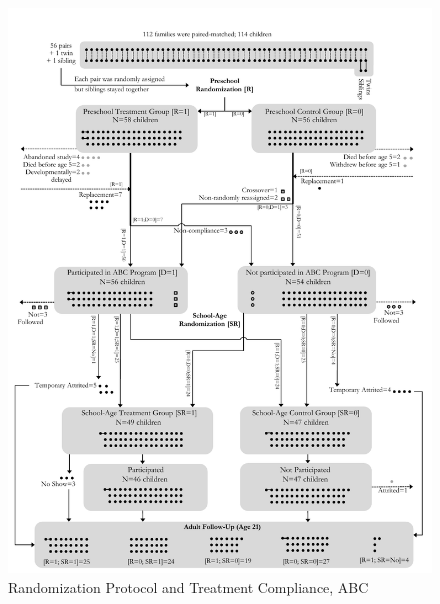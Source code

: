 	\begin{figure}[H]
		\caption{Randomization Protocol and Treatment Compliance, ABC} \label{fig:abc-flow}
		\centering
		\includegraphics[width=.92\columnwidth]{output/abc_Diagram.pdf}
	\end{figure}
	
